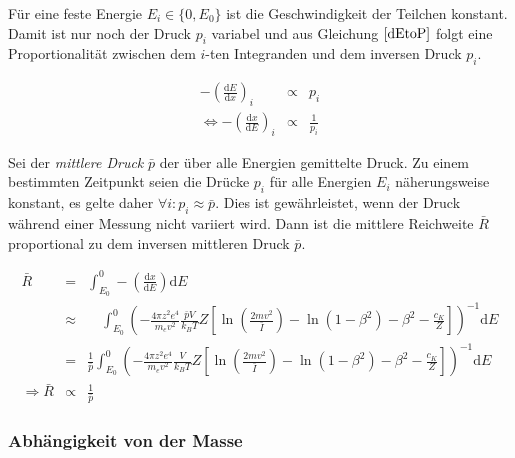 \documentclass[12pt,a4paper]{scrartcl}
\numberwithin{equation}{section} %
\renewcommand{\[}{} %
\renewcommand{\]}{\noindent} %
\begin{document}
Für eine feste Energie \(E_i \in \{0, E_0\}\) ist die Geschwindigkeit
der Teilchen konstant. Damit ist nur noch der Druck \(p_i\) variabel und
aus Gleichung \(\eqref{dEtoP}\) folgt eine Proportionalität zwischen dem
\(i\)-ten Integranden und dem inversen Druck \(p_i\).

\[
\begin{eqnarray}
    -\left(\frac{\mathrm dE}{\mathrm dx}\right)_i &\propto& p_i \\
    \Leftrightarrow -\left(\frac{\mathrm dx}{\mathrm dE}\right)_i
        &\propto& \frac{1}{p_i}
\end{eqnarray}
\]

Sei der \emph{mittlere Druck} \(\bar p\) der über alle Energien
gemittelte Druck. Zu einem bestimmten Zeitpunkt seien die Drücke \(p_i\)
für alle Energien \(E_i\) näherungsweise konstant, es gelte daher
\(\forall i: p_i \approx \bar p\). Dies ist gewährleistet, wenn der
Druck während einer Messung nicht variiert wird. Dann ist die mittlere
Reichweite \(\bar R\) proportional zu dem inversen mittleren Druck
\(\bar p\).

\[
\begin{eqnarray}
    \bar{R} &=&
        \int_{E_0}^{0} -\left(\frac{\mathrm dx}{\mathrm dE}\right) \mathrm dE \\
        &\approx&
            \quad
            \int_{E_0}^{0}
                \left(
                - \frac{4\pi z^2 e^4}{m_e v^2}
                \frac{\bar pV}{k_BT}
                Z\left[
                    \ln\left(\frac{2mv^2}{\bar I}\right)
                    - \ln\left(1 - \beta^2\right)
                    - \beta^2
                    - \frac{c_K}{Z}
                \right]
            \right)^{-1}
            \mathrm dE \\
        &=&
            \frac{1}{\bar p}
            \int_{E_0}^{0}
                \left(
                - \frac{4\pi z^2 e^4}{m_e v^2}
                \frac{V}{k_BT}
                Z\left[
                    \ln\left(\frac{2mv^2}{\bar I}\right)
                    - \ln\left(1 - \beta^2\right)
                    - \beta^2
                    - \frac{c_K}{Z}
                \right]
            \right)^{-1}
            \mathrm dE \\
    \Rightarrow \bar R &\propto& \frac{1}{\bar p}
\end{eqnarray}
\]

\hypertarget{abhuxe4ngigkeit-von-der-masse}{%
\subsubsection{Abhängigkeit von der
Masse}\label{abhuxe4ngigkeit-von-der-masse}}
\end{document}
